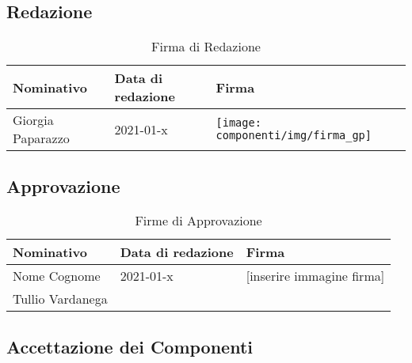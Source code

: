 \documentclass[../piano_di_progetto.tex]{subfiles}
\begin{document}
\subsection{Redazione}%
\label{sub:red}

\begin{table}[!ht]
	\centering
	\begin{tabular}{|l|l|l|}
		\hline
		\rowcolor{lightgray}
		\textbf{Nominativo} & \textbf{Data di redazione} & \textbf{Firma} \\ 
		\hline
			Giorgia Paparazzo & 2021-01-x  &   \texttt{[image: componenti/img/firma\_gp]} \\
		\hline
	\end{tabular}
	\caption{Firma di Redazione}
\end{table}


\subsection{Approvazione}%
\label{sub:app}

\begin{table}[!ht]
	\centering
	\begin{tabular}{|l|l|l|}
		\hline
		\rowcolor{lightgray}
		\textbf{Nominativo} & \textbf{Data di redazione} & \textbf{Firma} \\ 

		\hline
			Nome Cognome & 2021-01-x &  [inserire immagine firma] \\
		\hline
			Tullio Vardanega & & \\
		\hline
	\end{tabular}
		\caption{Firme di Approvazione}
\end{table}


\newpage
\subsection{Accettazione dei Componenti}%
\label{sub:acc_comp}
\end{document}
